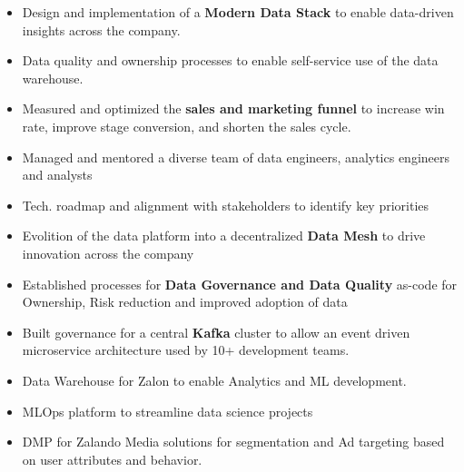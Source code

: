 \documentclass[10pt,a4paper,ragged2e,withhyper]{altacv}
\begin{document}
\begin{paracol}{2}


\begin{itemize}
  \item Design and implementation of a \textbf{Modern Data Stack} to enable data-driven insights across the company.
  \item Data quality and ownership processes to enable self-service use of the data warehouse.
  \item Measured and optimized the \textbf{sales and marketing funnel} to increase win rate, improve stage conversion, and shorten the sales cycle.
\end{itemize}

\divider

\begin{itemize}
  \item Managed and mentored a diverse team of data engineers, analytics engineers and analysts
  \item Tech. roadmap and alignment with stakeholders to identify key priorities
  \item Evolition of the data platform into a decentralized \textbf{Data Mesh} to drive innovation across the company
  \item Established processes for \textbf{Data Governance and Data Quality} as-code for Ownership, Risk reduction and improved adoption of data
  \item Built governance for a central \textbf{Kafka} cluster to allow an event driven microservice architecture used by 10+ development teams.
\end{itemize}

\divider

\begin{itemize}
  \item Data Warehouse for Zalon to enable Analytics and ML development. 
  \item MLOps platform to streamline data science projects 
  \item DMP for Zalando Media solutions for segmentation and Ad targeting based on user attributes and behavior.
\end{itemize}



\end{paracol}
\end{document}
